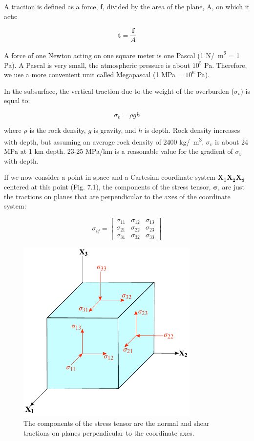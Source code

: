 \documentclass[a4paper , 12pt]{book}
\begin{document}
A traction is defined as a force, \textbf{f}, divided by the area of the plane, A, on which it acts:

\begin{equation}
    \mathbf{t}=\frac{\mathbf{f}}{A}
\end{equation}

A force of one Newton acting on one square meter is one Pascal (1 N/\SI{}{\metre\squared} = 1 Pa). A Pascal is very small, the atmospheric pressure is about $10^5$ Pa. Therefore, we use a more convenient unit called Megapascal (1 MPa = $10^6$ Pa). 

In the subsurface, the vertical traction due to the weight of the overburden ($\sigma_v$) is equal to:

\begin{equation}\label{eq7.2}
    \sigma_v=\rho g h
\end{equation}

where $\rho$ is the rock density, $g$ is gravity, and $h$ is depth. Rock density increases with depth, but assuming an average rock density of 2400 kg/\SI{}{\metre\cubed}, $\sigma_v$ is about 24 MPa at 1 km depth. 23-25 MPa/km is a reasonable value for the gradient of $\sigma_v$ with depth.

If we now consider a point in space and a Cartesian coordinate system $\mathbf{X_1X_2X_3}$ centered at this point (Fig. 7.1), the components of the stress tensor, $\boldsymbol{\sigma}$, are just the tractions on planes that are perpendicular to the axes of the coordinate system:

\begin{equation}
    \sigma_{ij}=\begin{bmatrix}\sigma_{11}&\sigma_{12}&\sigma_{13}\\\sigma_{21}&\sigma_{22}&\sigma_{23}\\\sigma_{31}&\sigma_{32}&\sigma_{33}\end{bmatrix}
\end{equation}

\begin{figure}[ht]
    \centering
    \includegraphics[width=9cm]{ch7f1.pdf}
    \caption{The components of the stress tensor are the normal and shear tractions on planes perpendicular to the coordinate axes.}
\end{figure}
\end{document}
